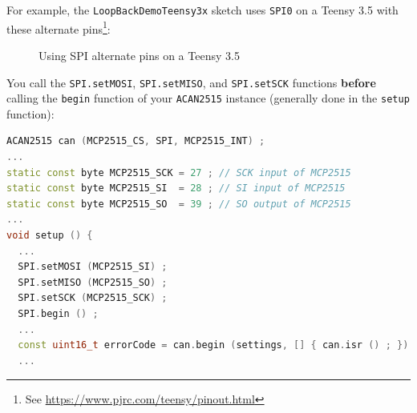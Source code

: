 \documentclass[10pt, a4paper, obeyspaces]{extarticle}
\newcommand\labelFigure[1]{\label{fig:#1}}
\begin{document}
For example, the \texttt{LoopBackDemoTeensy3x} sketch uses \texttt{SPI0} on a Teensy 3.5 with these alternate pins\footnote{See \url{https://www.pjrc.com/teensy/pinout.html}}:
\begin{figure}[!ht]
  \small
  \centering
  \caption{Using SPI alternate pins on a Teensy 3.5}
  \labelFigure{figureHardwareSPIAlternatePins}
\end{figure}

You call the \texttt{SPI.setMOSI}, \texttt{SPI.setMISO}, and \texttt{SPI.setSCK} functions \textbf{before} calling the \texttt{begin} function of your \texttt{ACAN2515} instance (generally done in the \texttt{setup} function):
{ \small\begin{lstlisting}[language=c++]
ACAN2515 can (MCP2515_CS, SPI, MCP2515_INT) ;
...
static const byte MCP2515_SCK = 27 ; // SCK input of MCP2515 
static const byte MCP2515_SI  = 28 ; // SI input of MCP2515  
static const byte MCP2515_SO  = 39 ; // SO output of MCP2515 
...
void setup () {
  ...
  SPI.setMOSI (MCP2515_SI) ;
  SPI.setMISO (MCP2515_SO) ;
  SPI.setSCK (MCP2515_SCK) ;
  SPI.begin () ;
  ...
  const uint16_t errorCode = can.begin (settings, [] { can.isr () ; }) ;
  ...
\end{lstlisting}}
\end{document}
